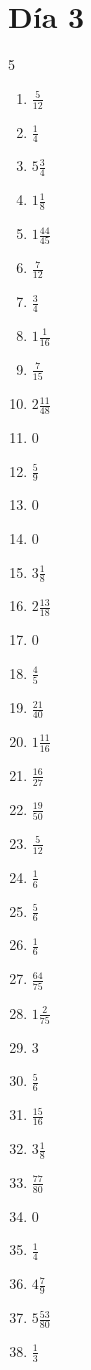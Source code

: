 \documentclass[12pt]{article}
\begin{document}
\section*{Día 3}
\begin{multicols}{5}\begin{enumerate}
\item $ \frac{5}{12} $
\item $ \frac{1}{4} $
\item $ 5 \frac{3}{4} $
\item $ 1 \frac{1}{8} $
\item $ 1 \frac{44}{45} $
\item $ \frac{7}{12} $
\item $ \frac{3}{4} $
\item $ 1 \frac{1}{16} $
\item $ \frac{7}{15} $
\item $ 2 \frac{11}{48} $
\item $ 0 $
\item $ \frac{5}{9} $
\item $ 0 $
\item $ 0 $
\item $ 3 \frac{1}{8} $
\item $ 2 \frac{13}{18} $
\item $ 0 $
\item $ \frac{4}{5} $
\item $ \frac{21}{40} $
\item $ 1 \frac{11}{16} $
\item $ \frac{16}{27} $
\item $ \frac{19}{50} $
\item $ \frac{5}{12} $
\item $ \frac{1}{6} $
\item $ \frac{5}{6} $
\item $ \frac{1}{6} $
\item $ \frac{64}{75} $
\item $ 1 \frac{2}{75} $
\item $ 3 $
\item $ \frac{5}{6} $
\item $ \frac{15}{16} $
\item $ 3 \frac{1}{8} $
\item $ \frac{77}{80} $
\item $ 0 $
\item $ \frac{1}{4} $
\item $ 4 \frac{7}{9} $
\item $ 5 \frac{53}{80} $
\item $ \frac{1}{3} $

\end{enumerate}
\end{multicols}
\end{document}
